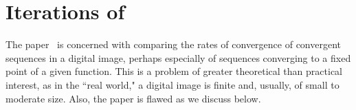 \documentclass{article}
\newtheorem{prop}[thm]{Proposition}
\newtheorem{exl}[thm]{Example}
\numberwithin{thm}{section}
\def\N{{\mathbb N}}
\begin{document}

\section{Iterations
of~\cite{BotmartEtal}}
The paper~\cite{BotmartEtal}
is concerned with 
comparing the rates
of convergence of
convergent sequences
in a digital image,
perhaps especially
of sequences converging
to a fixed point of
a given function.
This is a problem
of greater theoretical than
practical interest,
as in the ``real
world," a digital
image is finite and,
usually, of small to
moderate size. Also,
the paper is flawed
as we discuss below.
\end{document}
